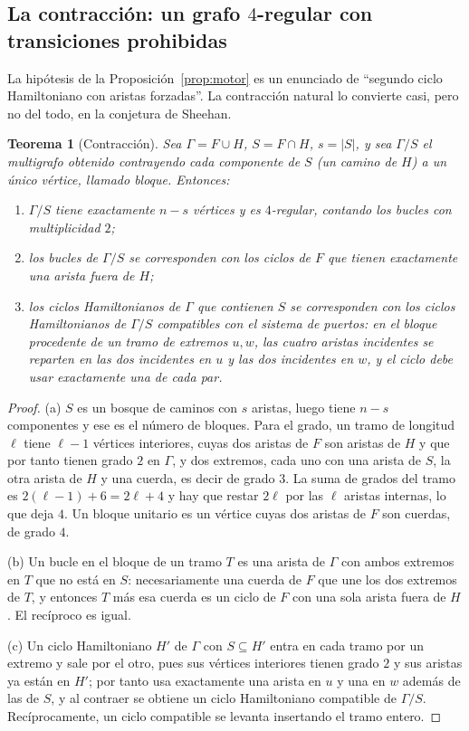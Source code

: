 \documentclass[11pt,a4paper]{article}
\newtheorem{teorema}{Teorema}[section]
\theoremstyle{definition}
\theoremstyle{remark}
\begin{document}
\subsection{La contracción: un grafo $4$-regular con transiciones prohibidas}

La hipótesis de la Proposición~\ref{prop:motor} es un enunciado de ``segundo ciclo Hamiltoniano con aristas forzadas''. La contracción natural lo convierte casi, pero no del todo, en la conjetura de Sheehan.

\begin{teorema}[Contracción]\label{thm:contraccion}
Sea $\Gamma=F\cup H$, $S=F\cap H$, $s=|S|$, y sea $\Gamma/S$ el multigrafo obtenido contrayendo cada componente de $S$ (un camino de $H$) a un único vértice, llamado \emph{bloque}. Entonces:
\begin{enumerate}[label=(\alph*)]
\item $\Gamma/S$ tiene exactamente $n-s$ vértices y es $4$-regular, contando los bucles con multiplicidad $2$;
\item los bucles de $\Gamma/S$ se corresponden con los ciclos de $F$ que tienen exactamente una arista fuera de $H$;
\item los ciclos Hamiltonianos de $\Gamma$ que contienen $S$ se corresponden con los ciclos Hamiltonianos de $\Gamma/S$ \emph{compatibles} con el sistema de puertos: en el bloque procedente de un tramo de extremos $u,w$, las cuatro aristas incidentes se reparten en las dos incidentes en $u$ y las dos incidentes en $w$, y el ciclo debe usar exactamente una de cada par.
\end{enumerate}
\end{teorema}

\begin{proof}
(a) $S$ es un bosque de caminos con $s$ aristas, luego tiene $n-s$ componentes y ese es el número de bloques. Para el grado, un tramo de longitud $\ell$ tiene $\ell-1$ vértices interiores, cuyas dos aristas de $F$ son aristas de $H$ y que por tanto tienen grado $2$ en $\Gamma$, y dos extremos, cada uno con una arista de $S$, la otra arista de $H$ y una cuerda, es decir de grado $3$. La suma de grados del tramo es $2(\ell-1)+6=2\ell+4$ y hay que restar $2\ell$ por las $\ell$ aristas internas, lo que deja $4$. Un bloque unitario es un vértice cuyas dos aristas de $F$ son cuerdas, de grado $4$.

(b) Un bucle en el bloque de un tramo $T$ es una arista de $\Gamma$ con ambos extremos en $T$ que no está en $S$: necesariamente una cuerda de $F$ que une los dos extremos de $T$, y entonces $T$ más esa cuerda es un ciclo de $F$ con una sola arista fuera de $H$. El recíproco es igual.

(c) Un ciclo Hamiltoniano $H'$ de $\Gamma$ con $S\subseteq H'$ entra en cada tramo por un extremo y sale por el otro, pues sus vértices interiores tienen grado $2$ y sus aristas ya están en $H'$; por tanto usa exactamente una arista en $u$ y una en $w$ además de las de $S$, y al contraer se obtiene un ciclo Hamiltoniano compatible de $\Gamma/S$. Recíprocamente, un ciclo compatible se levanta insertando el tramo entero.
\end{proof}
\end{document}
